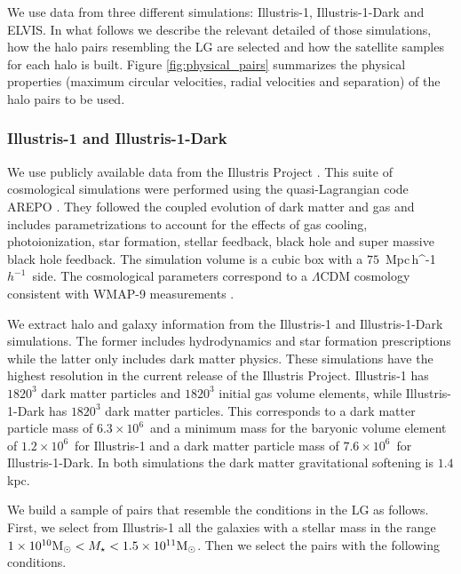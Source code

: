 \documentclass[a4paper,fleqn,usenatbib]{mnras}
\newcommand{\Mpch}{\,{\rm Mpc}\,\ifmmode h^{-1}\else $h^{-1}$\fi}
\newcommand{\Msun}{{\ifmmode{{\rm{M_{\odot}}}}\else{${\rm{M_{\odot}}}$}\fi}}
\begin{document}
We use data from three different simulations: Illustris-1,
Illustris-1-Dark and ELVIS. 
In what follows we describe the relevant detailed of those
simulations, how the halo pairs resembling the LG are selected and how
the satellite samples for each halo is built.
Figure \ref{fig:physical_pairs} summarizes the physical properties (maximum
circular velocities, radial velocities and separation) of the halo
pairs to be used.

\subsubsection{Illustris-1 and Illustris-1-Dark}
\label{sec:illustris}

We use publicly available data from the Illustris Project 
\citep{2014MNRAS.444.1518V}. 
This suite of cosmological simulations were performed using the quasi-Lagrangian
code AREPO \citep{2010MNRAS.401..791S}.
They followed the coupled evolution of dark  matter and gas and
includes parametrizations to account for the effects of 
gas cooling, photoionization, star formation, stellar feedback, black
hole and super massive black hole feedback. 
The simulation volume is a cubic box with a $75$ \Mpch\ side.
The cosmological parameters correspond to a $\Lambda$CDM cosmology
consistent with WMAP-9 measurements \citep{2013ApJS..208...19H}. 

We extract halo and galaxy information from the Illustris-1 and
Illustris-1-Dark simulations. 
The former includes hydrodynamics and star formation prescriptions while the latter only
includes dark matter physics. 
These simulations have the highest resolution in the current release of the
Illustris Project.
Illustris-1 has $1820^3$ dark matter particles and $1820^3$ initial gas
volume elements, while Illustris-1-Dark has $1820^3$ dark matter particles.
This corresponds to a dark matter particle mass of
$6.3\times 10^6$\Msun\ and a minimum mass for the baryonic volume
element of $1.2\times 10^6$\Msun\ for Illustris-1 and a dark matter
particle mass of $7.6\times 10^6$\Msun\ for Illustris-1-Dark.
In both simulations the dark matter gravitational softening is $1.4$
kpc.

We build a sample of pairs that resemble the conditions in the LG as follows.
First, we select from Illustris-1 all the galaxies with a stellar mass
in the range $1\times10^{10}\Msun <M_{\star}<1.5 \times 10^{11} \Msun$.
Then we select the pairs with the following conditions.
\end{document}
